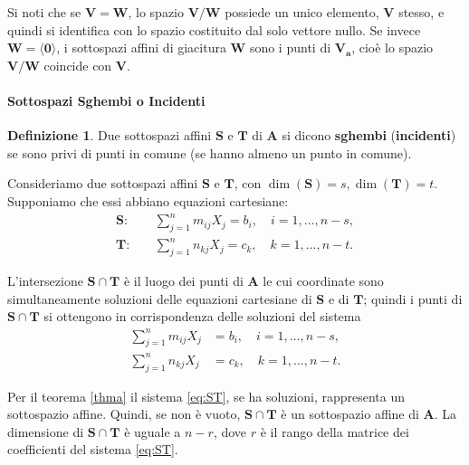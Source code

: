 \documentclass{article}
\theoremstyle{plain}
\theoremstyle{definition}
\newtheorem{defn}{Definizione}[section]
\theoremstyle{remark}
\begin{document}
\vspace{10pt}

Si noti che se $\mathbf{V}=\mathbf{W}$, lo spazio $\mathbf{V}/\mathbf{W}$ possiede un unico elemento, $\mathbf{V}$ stesso, e quindi si identifica con lo spazio costituito dal solo vettore nullo. 
Se invece $\mathbf{W}=\langle\mathbf{0}\rangle$, i sottospazi affini di giacitura $\mathbf{W}$ sono i punti di $\mathbf{V_a}$, cioè lo spazio $\mathbf{V}/\mathbf{W}$ coincide con $\mathbf{V}$.

\vspace{10pt}

\paragraph{Sottospazi Sghembi o Incidenti}
\begin{bxthm}
\begin{defn}
    Due sottospazi affini $\mathbf{S}$ e $\mathbf{T}$ di $\mathbf{A}$ si dicono \textbf{sghembi} (\textbf{incidenti}) se sono privi di punti in comune (se hanno almeno un punto in comune).
\end{defn}
\end{bxthm}

\vspace{10pt}

Consideriamo due sottospazi affini $\mathbf{S}$ e $\mathbf{T}$, con $\dim(\mathbf{S})=s, \dim(\mathbf{T})=t$.
Supponiamo che essi abbiano equazioni cartesiane:
\begin{align}
  \mathbf{S}:\quad & \sum_{j=1}^n m_{i j} X_j = b_i,\quad i=1,\dots,n - s, \label{eq:S}\\
  \mathbf{T}:\quad & \sum_{j=1}^n n_{k j} X_j = c_k,\quad k=1,\dots,n - t. \label{eq:T}
\end{align}

L'intersezione $\mathbf{S} \cap \mathbf{T}$ è il luogo dei punti di $\mathbf{A}$ le cui coordinate sono simultaneamente soluzioni delle equazioni cartesiane di $\mathbf{S}$ e di $\mathbf{T}$; 
quindi i punti di $\mathbf{S} \cap \mathbf{T}$ si ottengono in corrispondenza delle soluzioni del sistema
\begin{align}
  \sum_{j=1}^n m_{i j} X_j &= b_i,\quad i=1,\dots,n - s,\nonumber\\
  \sum_{j=1}^n n_{k j} X_j &= c_k,\quad k=1,\dots,n - t. \label{eq:ST}
\end{align}

Per il teorema \ref{thma} il sistema \eqref{eq:ST}, se ha soluzioni, rappresenta un sottospazio affine. 
Quindi, se non è vuoto, $\mathbf{S} \cap \mathbf{T}$ è un sottospazio affine di $\mathbf{A}$. 
La dimensione di $\mathbf{S} \cap \mathbf{T}$ è uguale a $n - r$, dove $r$ è il rango della matrice dei coefficienti del sistema \eqref{eq:ST}.  
\end{document}
